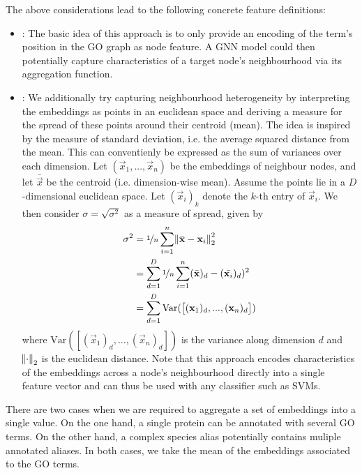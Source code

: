 \documentclass[
	fontsize=10pt, %
	twoside=false, %
	secnumdepth=1, %
  toc=indentunnumbered %
]{kaobook}
\begin{document}
The above considerations lead to the following concrete feature definitions:
\begin{itemize}
\item {}: The basic idea of this approach is to only provide an
  encoding of the term's position in the GO graph as node feature. A GNN model
  could then potentially capture characteristics of a target node's
  neighbourhood via its aggregation function.
\item {}: We additionally try capturing neighbourhood
  heterogeneity by interpreting the embeddings as points in an euclidean space
  and deriving a measure for the spread of these points around their centroid
  (mean). The idea is inspired by the measure of standard deviation, i.e. the
  average squared distance from the mean. This can conventienly be expressed as
  the sum of variances over each dimension. Let $(\vec x_1, ..., \vec x_n)$ be
  the embeddings of neighbour nodes, and let $\bar{\vec x}$ be the centroid
  (i.e. dimension-wise mean). Assume the points lie in a $D$-dimensional
  euclidean space. Let $(\vec x_i)_k$ denote the $k$-th entry of $\vec x_i$. We
  then consider $\sigma = \sqrt{\sigma^2}$ as a measure of spread, given by
  \begin{align*}
    \sigma^2 &= \nicefrac{1}{n} \sum_{i=1}^n \norm{\bar{\mathbf{x}} - \mathbf{x}_i}_2^2 \\
             &= \sum_{d=1}^D \nicefrac{1}{n} \sum_{i=1}^n
               (\bar{\mathbf{x}})_d - (\bar{\mathbf{x}_i})_d)^2 \\
             &= \sum_{d=1}^D \text{Var}(\left[
               (\mathbf{x}_1)_d, ..., (\mathbf{x}_n)_d
               \right])
  \end{align*}
  where $\text{Var}(\left[(\vec x_1)_d, ..., (\vec x_n)_d \right])$ is the
  variance along dimension $d$ and $\norm{\cdot}_2$ is the euclidean distance.
  Note that this approach encodes characteristics of the embeddings across a
  node's neighbourhood directly into a single feature vector and can thus be
  used with any classifier such as SVMs.
\end{itemize}


There are two cases when we are required to
aggregate a set of embeddings into a single value. On the one hand, a single
protein can be annotated with several GO terms. On the other hand, a complex
species alias potentially contains muliple annotated aliases. In both cases,
we take the mean of the embeddings associated to the GO terms.
\end{document}
